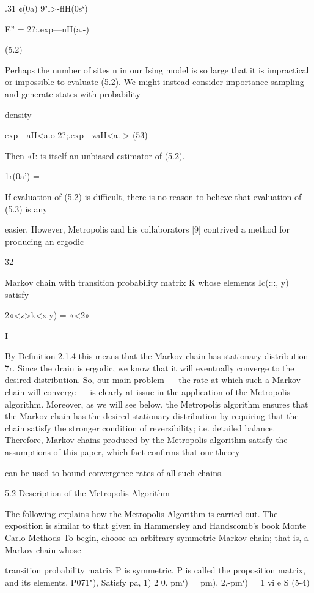 .31 ¢(0a) 9"l>{-ﬂH(0s‘)}

E” = 2?;.exp{—nH(a.-)}

(5.2)

Perhaps the number of sites n in our Ising model is so large that it is impractical or impossible to
evaluate (5.2). We might instead consider importance sampling and generate states with probability

density

exp{—aH<a.o}
2?;.exp{—zaH<a.->} (53)

Then «I: is itself an unbiased estimator of (5.2).

1r(0a') =

If evaluation of (5.2) is difficult, there is no reason to believe that evaluation of (5.3) is any

easier. However, Metropolis and his collaborators [9] contrived a method for producing an ergodic

32

Markov chain with transition probability matrix K whose elements Ic(:::, y) satisfy

2«<z>k<x.y) = «<2»

I

By Deﬁnition 2.1.4 this means that the Markov chain has stationary distribution 7r. Since the
drain is ergodic, we know that it will eventually converge to the desired distribution. So, our main
problem — the rate at which such a Markov chain will converge — is clearly at issue in the application
of the Metropolis algorithm. Moreover, as we will see below, the Metropolis algorithm ensures that
the Markov chain has the desired stationary distribution by requiring that the chain satisfy the
stronger condition of reversibility; i.e. detailed balance. Therefore, Markov chains produced by the
Metropolis algorithm satisfy the assumptions of this paper, which fact conﬁrms that our theory

can be used to bound convergence rates of all such chains.

5.2 Description of the Metropolis Algorithm

The following explains how the Metropolis Algorithm is carried out. The exposition is
similar to that given in Hammersley and Handscomb’s book Monte Carlo Methods 
To begin, choose an arbitrary symmetric Markov chain; that is, a Markov chain whose

transition probability matrix P is symmetric. P is called the proposition matrix, and its elements,
P071"), Satisfy
pa, 1) 2 0. pm‘) = pm). 2,-pm‘) = 1 vi e S (5-4)

